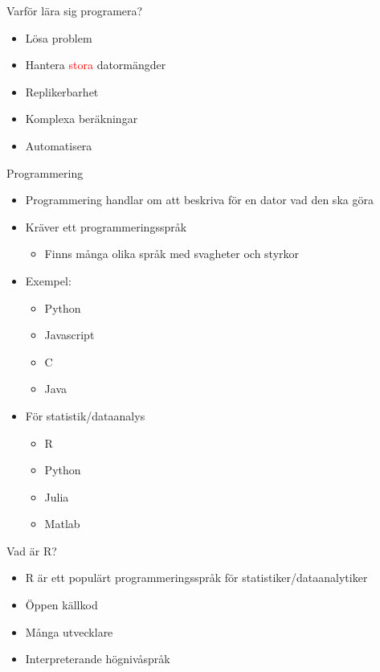 \documentclass[
  10pt,
  ignorenonframetext,
]{beamer}
\providecommand{\tightlist}{%
  \setlength{\itemsep}{0pt}\setlength{\parskip}{0pt}}
\begin{document}
\begin{frame}{Varför lära sig programera?}
\protect\hypertarget{varfuxf6r-luxe4ra-sig-programera}{}
\begin{itemize}[<+->]
\tightlist
\item
  Lösa problem
\item
  Hantera \textcolor{red}{stora} datormängder
\item
  Replikerbarhet
\item
  Komplexa beräkningar
\item
  Automatisera
\end{itemize}
\end{frame}

\begin{frame}{Programmering}
\protect\hypertarget{programmering}{}
\begin{itemize}
\tightlist
\item
  Programmering handlar om att beskriva för en dator vad den ska göra
\item
  Kräver ett programmeringsspråk

  \begin{itemize}
  \tightlist
  \item
    Finns många olika språk med svagheter och styrkor
  \end{itemize}
\item
  Exempel:

  \begin{itemize}
  \tightlist
  \item
    Python
  \item
    Javascript
  \item
    C
  \item
    Java
  \end{itemize}
\item
  För statistik/dataanalys

  \begin{itemize}
  \tightlist
  \item
    R
  \item
    Python
  \item
    Julia
  \item
    Matlab
  \end{itemize}
\end{itemize}
\end{frame}

\begin{frame}{Vad är R?}
\protect\hypertarget{vad-uxe4r-r}{}
\begin{itemize}[<+->]
\tightlist
\item
  R är ett populärt programmeringsspråk för statistiker/dataanalytiker
\item
  Öppen källkod
\item
  Många utvecklare
\item
  Interpreterande högnivåspråk
\end{itemize}
\end{frame}
\end{document}
